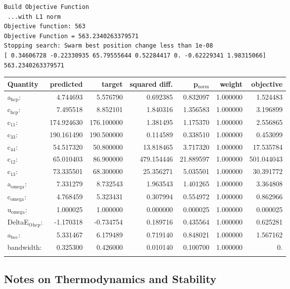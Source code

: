 \documentclass[11pt]{article}
\begin{document}
\begin{verbatim}
Build Objective Function
 ...with L1 norm 
Objective function: 563 
Objective Function = 563.2340263379571 
Stopping search: Swarm best position change less than 1e-08 
[ 0.34606728 -0.22330935 65.79555644 0.52284417 0. -0.62229341 1.98315066] 
563.2340263379571
\end{verbatim}

\begin{center}
\begin{tabular}{lrrrrrr}
Quantity & predicted & target & squared diff. & p$_{\text{norm}}$ & weight & objective\\
\hline
a$_{\text{hcp}}$: & 4.744693 & 5.576790 & 0.692385 & 0.832097 & 1.000000 & 1.524483\\
c$_{\text{hcp}}$: & 7.495518 & 8.852101 & 1.840316 & 1.356583 & 1.000000 & 3.196899\\
c$_{\text{11}}$: & 174.924630 & 176.100000 & 1.381495 & 1.175370 & 1.000000 & 2.556865\\
c$_{\text{33}}$: & 190.161490 & 190.500000 & 0.114589 & 0.338510 & 1.000000 & 0.453099\\
c$_{\text{44}}$: & 54.517320 & 50.800000 & 13.818465 & 3.717320 & 1.000000 & 17.535784\\
c$_{\text{12}}$: & 65.010403 & 86.900000 & 479.154446 & 21.889597 & 1.000000 & 501.044043\\
c$_{\text{13}}$: & 73.335501 & 68.300000 & 25.356271 & 5.035501 & 1.000000 & 30.391772\\
a$_{\text{omega}}$: & 7.331279 & 8.732543 & 1.963543 & 1.401265 & 1.000000 & 3.364808\\
c$_{\text{omega}}$: & 4.768459 & 5.323431 & 0.307994 & 0.554972 & 1.000000 & 0.862966\\
u$_{\text{omega}}$: & 1.000025 & 1.000000 & 0.000000 & 0.000025 & 1.000000 & 0.000025\\
DeltaE$_{\text{O}}$$_{\text{hcp}}$: & -1.170318 & -0.734754 & 0.189716 & 0.435564 & 1.000000 & 0.625281\\
a$_{\text{bcc}}$: & 5.331467 & 6.179489 & 0.719140 & 0.848021 & 1.000000 & 1.567162\\
bandwidth: & 0.325300 & 0.426000 & 0.010140 & 0.100700 & 1.000000 & 0.\\
 &  &  &  &  &  & \\
\end{tabular}
\end{center}

\subsection{Notes on Thermodynamics and Stability}
\label{sec-2-4}
\end{document}
